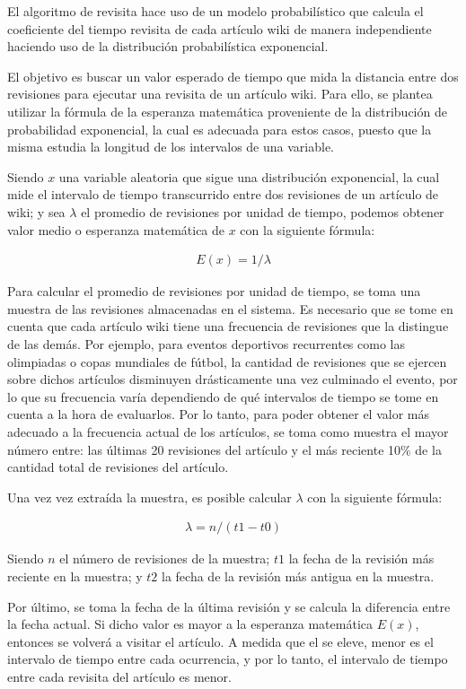 El algoritmo de revisita hace uso de un modelo probabilístico que calcula el coeficiente del tiempo revisita de cada artículo wiki de manera independiente haciendo uso de la distribución probabilística exponencial.

El objetivo es buscar un valor esperado de tiempo que mida la distancia entre dos revisiones para ejecutar una revisita de un artículo wiki.
Para ello, se plantea utilizar la fórmula de la esperanza matemática proveniente de la distribución de probabilidad exponencial, la cual es adecuada para estos casos, puesto que la misma estudia la longitud de los intervalos de una variable.

Siendo $x$  una variable aleatoria que sigue una distribución exponencial, la cual mide el intervalo de tiempo transcurrido entre dos revisiones de un artículo de wiki;
y sea $\lambda$ el promedio de revisiones por unidad de tiempo, podemos obtener valor medio o esperanza  matemática de $x$ con la siguiente fórmula:

\begin{gather*}
E(x) = 1 / \lambda
\end{gather*}

Para calcular el promedio de revisiones por unidad de tiempo, se toma una muestra de las revisiones almacenadas en el sistema.
Es necesario que se tome en cuenta que cada artículo wiki tiene una frecuencia de revisiones que la distingue de las demás.
Por ejemplo, para eventos deportivos recurrentes como las olimpiadas o copas mundiales de fútbol, la cantidad de revisiones que se ejercen sobre dichos artículos disminuyen drásticamente una vez culminado el evento, por lo que su frecuencia varía dependiendo de qué intervalos de tiempo se tome en cuenta a la hora de evaluarlos.
Por lo tanto, para poder obtener el valor más adecuado a la frecuencia actual de los artículos, se toma como muestra el mayor número entre: las últimas 20 revisiones del artículo y el más reciente 10\% de la cantidad total de revisiones del artículo.

Una vez vez extraída la muestra, es posible calcular $\lambda$ con la siguiente fórmula:

\begin{gather*}
\lambda = n / (t1 - t0)
\end{gather*}

Siendo $n$ el número de revisiones de la muestra;
$t1$ la fecha de la revisión más reciente en la muestra;
y $t2$ la fecha de la revisión más antigua en la muestra.

Por último, se toma la fecha de la última revisión y se calcula la diferencia entre la fecha actual.
Si dicho valor es mayor a la esperanza matemática $E(x)$, entonces se volverá a visitar el artículo.
A medida que el  se eleve, menor es el intervalo de tiempo entre cada ocurrencia, y por lo tanto, el intervalo de tiempo entre cada revisita del artículo es menor.

